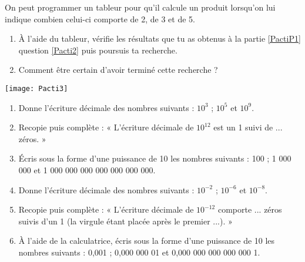 \begin{activite}
\begin{partie}On peut programmer un tableur pour qu'il calcule un produit lorsqu'on lui indique combien celui-ci comporte de 2, de 3 et de 5.

\begin{minipage}{.62\linewidth}
\begin{enumerate}
\item À l'aide du tableur, vérifie les résultats que tu as obtenus à la partie \ref{PactiP1} question \ref{Pacti2} puis poursuis ta recherche.
\item Comment être certain d'avoir terminé cette recherche ?
\end{enumerate}
\end{minipage}\hfill%
\begin{minipage}{.35\linewidth}
\centering
\texttt{[image: Pacti3]}
\end{minipage}
\end{partie}
 \end{activite}
 
 
\begin{activite}
\begin{enumerate}
\item Donne l'écriture décimale des nombres suivants : $10^3$ ; $10^5$ et $10^9$.
\item Recopie puis complète : « L'écriture décimale de $10^{12}$ est un 1 suivi de ... zéros. »
\item Écris sous la forme d'une puissance de 10 les nombres suivants : 
	100 ; 1 000 000 et 1 000 000 000 000 000 000 000.
\item Donne l'écriture décimale des nombres suivants : $10^{-2}$ ; $10^{-6}$ et $10^{-8}$.
\item Recopie puis complète : « L'écriture décimale de $10^{-12}$ comporte ... zéros suivis d'un 1 (la virgule étant placée après le premier ...). »
\item À l'aide de la calculatrice, écris sous la forme d'une puissance de 10 les nombres suivants : 
 0,001 ; 0,000 000 01 et 0,000 000 000 000 000 1.
\end{enumerate}
\end{activite}


